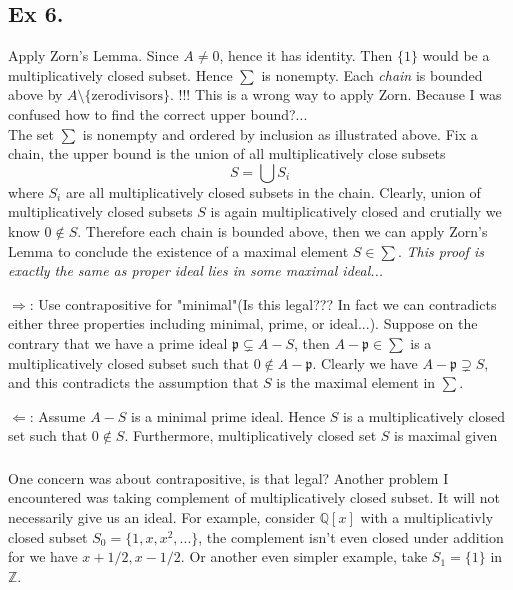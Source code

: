 \subsection{Ex 6.}

Apply Zorn's Lemma. Since $A\neq 0$, hence it has identity. Then $\{1\}$ would be a multiplicatively closed subset. Hence $\sum$ is nonempty. Each \textit{chain} is bounded above by $A\setminus\{\text{zerodivisors}\}$. !!!
This is a wrong way to apply Zorn. Because I was confused how to find the correct upper bound?...\\

The set $\sum$ is nonempty and ordered by inclusion as illustrated above. Fix a chain, the upper bound is the union of all multiplicatively close subsets \[S=\bigcup S_i\] where $S_i$ are all multiplicatively closed subsets in the chain. Clearly, union of multiplicatively closed subsets $S$ is again multiplicatively closed and crutially we know $0\notin S$. Therefore each chain is bounded above, then we can apply Zorn's Lemma to conclude the existence of a maximal element $S\in \sum$. \textit{This proof is exactly the same as proper ideal lies in some maximal ideal...}

$\Rightarrow$: Use contrapositive for "minimal"(Is this legal??? In fact we can contradicts either three properties including minimal, prime, or ideal...). Suppose on the contrary that we have a prime ideal $\mathfrak p\subsetneq A-S$, then $A-\mathfrak p\in \sum$ is a multiplicatively closed subset such that $0\notin A-\mathfrak p$. Clearly we have $A-\mathfrak p\supsetneq S$, and this contradicts the assumption that $S$ is the maximal element in $\sum$.

$\Leftarrow$: Assume $A-S$ is a minimal prime ideal. Hence $S$ is a multiplicatively closed set such that $0\notin S$. Furthermore, multiplicatively closed set $S$ is maximal given

\subsubsection{}
One concern was about contrapositive, is that legal? Another problem I encountered was taking complement of multiplicatively closed subset. It will not necessarily give us an ideal. For example, consider $\mathbb Q[x]$ with a multiplicativly closed subset $S_0=\{1,x,x^2,...\}$, the complement isn't even closed under addition for we have $x+1/2,x-1/2$. Or another even simpler example, take $S_1=\{1\}$ in $\mathbb Z$.

